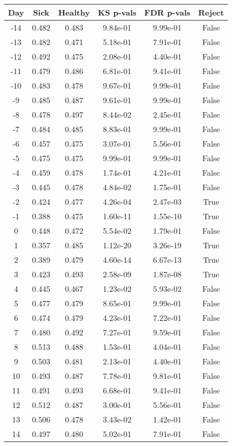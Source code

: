 \begin{tabular}{c|c|c|c|c|c}
Day &  Sick & Healthy &  KS p-vals & FDR p-vals & Reject\\
\hline
-14 & 0.482 &   0.483 &   9.84e-01 &   9.99e-01 &  False\\
-13 & 0.482 &   0.471 &   5.18e-01 &   7.91e-01 &  False\\
-12 & 0.492 &   0.475 &   2.08e-01 &   4.40e-01 &  False\\
-11 & 0.479 &   0.486 &   6.81e-01 &   9.41e-01 &  False\\
-10 & 0.483 &   0.478 &   9.67e-01 &   9.99e-01 &  False\\
 -9 & 0.485 &   0.487 &   9.61e-01 &   9.99e-01 &  False\\
 -8 & 0.478 &   0.497 &   8.44e-02 &   2.45e-01 &  False\\
 -7 & 0.484 &   0.485 &   8.83e-01 &   9.99e-01 &  False\\
 -6 & 0.457 &   0.475 &   3.07e-01 &   5.56e-01 &  False\\
 -5 & 0.475 &   0.475 &   9.99e-01 &   9.99e-01 &  False\\
 -4 & 0.459 &   0.478 &   1.74e-01 &   4.21e-01 &  False\\
 -3 & 0.445 &   0.478 &   4.84e-02 &   1.75e-01 &  False\\
 -2 & 0.424 &   0.477 &   4.26e-04 &   2.47e-03 &   True\\
 -1 & 0.388 &   0.475 &   1.60e-11 &   1.55e-10 &   True\\
  0 & 0.448 &   0.472 &   5.54e-02 &   1.79e-01 &  False\\
  1 & 0.357 &   0.485 &   1.12e-20 &   3.26e-19 &   True\\
  2 & 0.389 &   0.479 &   4.60e-14 &   6.67e-13 &   True\\
  3 & 0.423 &   0.493 &   2.58e-09 &   1.87e-08 &   True\\
  4 & 0.445 &   0.467 &   1.23e-02 &   5.93e-02 &  False\\
  5 & 0.477 &   0.479 &   8.65e-01 &   9.99e-01 &  False\\
  6 & 0.474 &   0.479 &   4.23e-01 &   7.22e-01 &  False\\
  7 & 0.480 &   0.492 &   7.27e-01 &   9.59e-01 &  False\\
  8 & 0.513 &   0.488 &   1.53e-01 &   4.04e-01 &  False\\
  9 & 0.503 &   0.481 &   2.13e-01 &   4.40e-01 &  False\\
 10 & 0.493 &   0.487 &   7.78e-01 &   9.81e-01 &  False\\
 11 & 0.491 &   0.493 &   6.68e-01 &   9.41e-01 &  False\\
 12 & 0.512 &   0.487 &   3.00e-01 &   5.56e-01 &  False\\
 13 & 0.506 &   0.478 &   3.43e-02 &   1.42e-01 &  False\\
 14 & 0.497 &   0.480 &   5.02e-01 &   7.91e-01 &  False\\
\end{tabular}